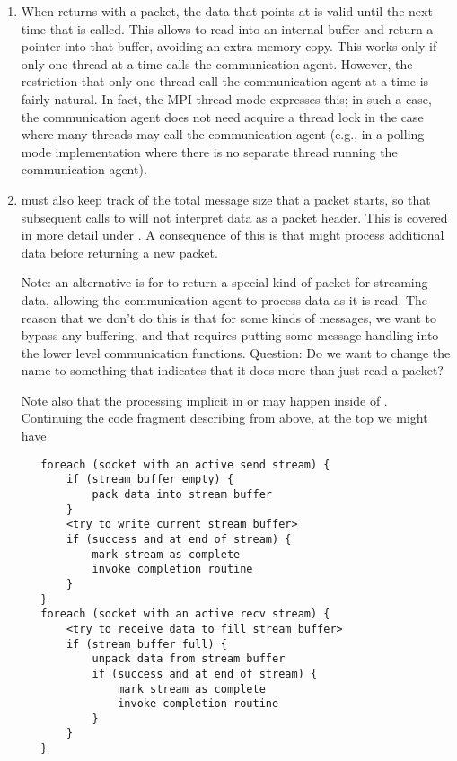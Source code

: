 \begin{enumerate}
\item When  returns with a packet, the data that
   points at is valid until the next time that
   is called.  This allows
   to read 
  into an internal buffer and return a pointer into that buffer, avoiding an
  extra memory copy.  This works only if only one thread at a time calls the
  communication agent.  However, the restriction that only one thread call the
  communication agent at a time is fairly natural.  In fact, the MPI thread
  mode  expresses this; in such a case, the
  communication agent does not need acquire a thread lock in the case where
  many threads may call the communication agent (e.g., in a polling mode
  implementation where there is no separate thread running the communication
  agent).

\item {} must also keep track of the total message
  size that 
  a packet starts, so that subsequent calls to  will
  not 
  interpret data as a packet header.  This is covered in more detail under
  .  A consequence of this is that
   might process additional data before returning a
  new packet.

  Note: an alternative is for  to return a special
  kind of packet for streaming data, allowing the communication agent to
  process data as it is read.  The reason that we don't do this is that for
  some kinds of messages, we want to bypass any buffering, and that requires
  putting some message handling into the lower level communication functions.
  Question: Do we want to change the name to something that indicates that it
  does more than just read a packet?

  Note also that the processing implicit in  or
   may happen inside of
  .  Continuing the code fragment describing
   from above, at the top we might have
\begin{verbatim}
   foreach (socket with an active send stream) {
       if (stream buffer empty) {
           pack data into stream buffer
       }
       <try to write current stream buffer>
       if (success and at end of stream) {
           mark stream as complete
           invoke completion routine
       }
   }
   foreach (socket with an active recv stream) {
       <try to receive data to fill stream buffer>
       if (stream buffer full) {
           unpack data from stream buffer
           if (success and at end of stream) {
               mark stream as complete
               invoke completion routine
           }
       }
   }
\end{verbatim}



\end{enumerate}

